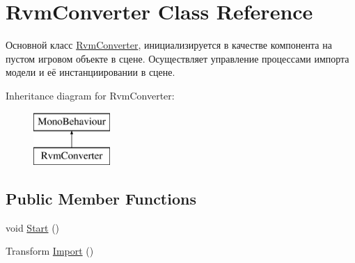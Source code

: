 \hypertarget{class_rvm_converter}{}\section{Rvm\+Converter Class Reference}
\label{class_rvm_converter}


Основной класс \mbox{\hyperlink{class_rvm_converter}{Rvm\+Converter}}, инициализируется в качестве компонента на пустом игровом объекте в сцене. Осуществляет управление процессами импорта модели и её инстанциировании в сцене.  


Inheritance diagram for Rvm\+Converter\+:\begin{figure}[H]
\begin{center}
\leavevmode
\includegraphics[height=2.000000cm]{class_rvm_converter}
\end{center}
\end{figure}
\subsection*{Public Member Functions}
\begin{DoxyCompactItemize}
\item 
void \mbox{\hyperlink{class_rvm_converter_a3a476e45c2cabe4e69c9a15e4223f2de}{Start}} ()
\item 
Transform \mbox{\hyperlink{class_rvm_converter_a984b9502e39db3fcffc74d3281a1a155}{Import}} ()
\end{DoxyCompactItemize}
